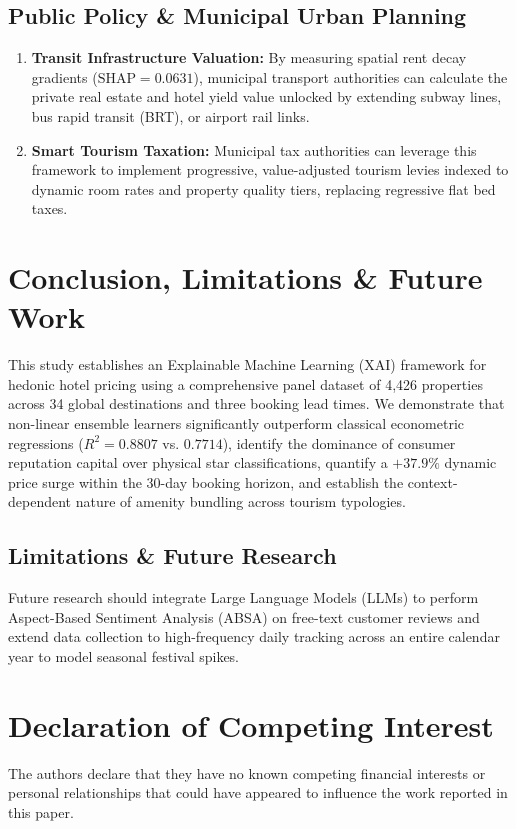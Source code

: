 \documentclass[11pt,a4paper]{article}
\begin{document}
\subsection{Public Policy \& Municipal Urban Planning}
\begin{enumerate}
    \item \textbf{Transit Infrastructure Valuation:} By measuring spatial rent decay gradients ($\text{SHAP} = 0.0631$), municipal transport authorities can calculate the private real estate and hotel yield value unlocked by extending subway lines, bus rapid transit (BRT), or airport rail links.
    \item \textbf{Smart Tourism Taxation:} Municipal tax authorities can leverage this framework to implement progressive, value-adjusted tourism levies indexed to dynamic room rates and property quality tiers, replacing regressive flat bed taxes.
\end{enumerate}

\section{Conclusion, Limitations \& Future Work}

This study establishes an Explainable Machine Learning (XAI) framework for hedonic hotel pricing using a comprehensive panel dataset of 4,426 properties across 34 global destinations and three booking lead times. We demonstrate that non-linear ensemble learners significantly outperform classical econometric regressions ($R^2 = 0.8807$ vs. $0.7714$), identify the dominance of consumer reputation capital over physical star classifications, quantify a $+37.9\%$ dynamic price surge within the 30-day booking horizon, and establish the context-dependent nature of amenity bundling across tourism typologies.

\subsection{Limitations \& Future Research}
Future research should integrate Large Language Models (LLMs) to perform Aspect-Based Sentiment Analysis (ABSA) on free-text customer reviews and extend data collection to high-frequency daily tracking across an entire calendar year to model seasonal festival spikes.

\section*{Declaration of Competing Interest}
The authors declare that they have no known competing financial interests or personal relationships that could have appeared to influence the work reported in this paper.
\end{document}
